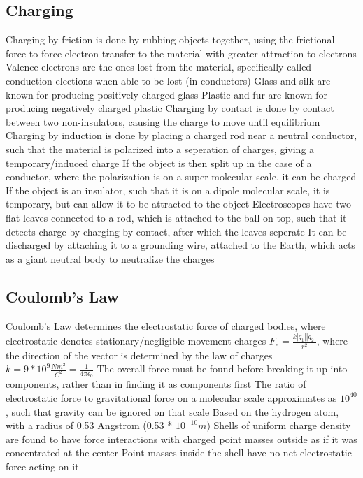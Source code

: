 \documentclass[11 pt, twoside]{article}
\newenvironment{outline*}
{
	\begin{outline}[enumerate]
	}
	{\end{outline}
}
\begin{document}
\subsection{Charging}
\begin{outline*}
\1 Charging by friction is done by rubbing objects together, using the frictional force to force electron transfer to the material with greater attraction to electrons
\2 Valence electrons are the ones lost from the material, specifically called conduction elections when able to be lost (in conductors)
\2 Glass and silk are known for producing positively charged glass
\2 Plastic and fur are known for producing negatively charged plastic
\1 Charging by contact is done by contact between two non-insulators, causing the charge to move until equilibrium
\1 Charging by induction is done by placing a charged rod near a neutral conductor, such that the material is polarized into a seperation of charges, giving a temporary/induced charge
\2 If the object is then split up in the case of a conductor, where the polarization is on a super-molecular scale, it can be charged
\2 If the object is an insulator, such that it is on a dipole molecular scale, it is temporary, but can allow it to be attracted to the object
\1 Electroscopes have two flat leaves connected to a rod, which is attached to the ball on top, such that it detects charge by charging by contact, after which the leaves seperate
\2 It can be discharged by attaching it to a grounding wire, attached to the Earth, which acts as a giant neutral body to neutralize the charges
\end{outline*}

\subsection{Coulomb's Law}
\begin{outline*}
\1 Coulomb's Law determines the electrostatic force of charged bodies, where electrostatic denotes stationary/negligible-movement charges
\1 $F_e = \frac{k|q_1||q_2|}{r^2}$, where the direction of the vector is determined by the law of charges
\2 $k = 9 * 10^9 \frac{Nm^2}{C^2} = \frac{1}{4\pi\epsilon_0}$
\2 The overall force must be found before breaking it up into components, rather than in finding it as components first
\1 The ratio of electrostatic force to gravitational force on a molecular scale approximates as $10^{40}$, such that gravity can be ignored on that scale
\2 Based on the hydrogen atom, with a radius of 0.53 Angstrom (0.53 * $10^{-10} m)$
\1 Shells of uniform charge density are found to have force interactions with charged point masses outside as if it was concentrated at the center
\2 Point masses inside the shell have no net electrostatic force acting on it
\end{outline*}
\end{document}
